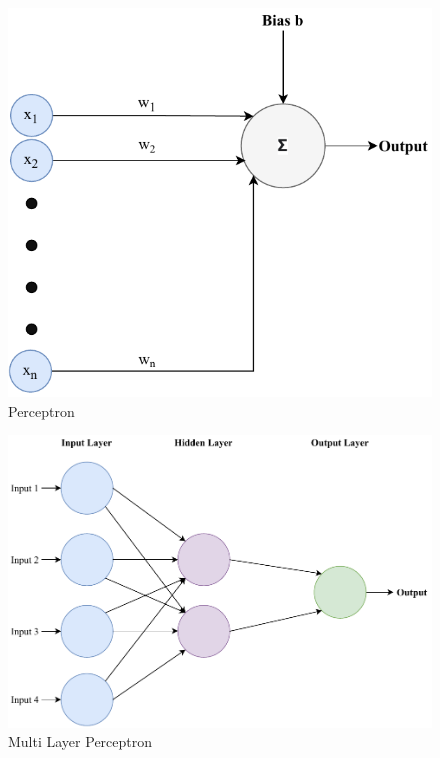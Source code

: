 \begin{figure}[H]
    \centering
    \includegraphics[scale=0.75]{images/fig_chapter2/nns/perceptron.pdf}
    \caption{Perceptron}
    \label{fig:perceptron}
\end{figure}

\begin{figure}[H]
    \centering
    \includegraphics[scale=0.7]{images/fig_chapter2/nns/mlp.pdf}
    \caption{Multi Layer Perceptron}
    \label{fig:mlp}
\end{figure}

